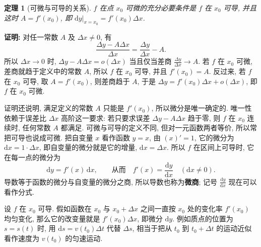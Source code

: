 \documentclass[UTF8,openany]{ctexbook}
\theoremstyle{chinesetextbook}
\newenvironment{cnproof}{\par\indent\textbf{证明:} \ignorespaces}{\par}
\newtheorem*{theoremsingle}{定理}
\newcommand{\dd}{\mathrm d}
\begin{document}
\begin{theoremsingle}[可微与可导的关系]
$f$ 在点 $x_0$ 可微的充分必要条件是 $f$ 在 $x_0$ 可导, 并且这时 $A=f'(x_0)$, 即 $\dd y\big|_{x=x_0}=f'(x_0)\Delta x$.
\end{theoremsingle}
\begin{cnproof}
对任一常数 $A$ 及 $\Delta x\ne0$, 有
\[
\frac{\Delta y-A\Delta x}{\Delta x}=\frac{\Delta y}{\Delta x}-A.
\]
所以 $\Delta x\to0$ 时, $\Delta y-A\Delta x=o(\Delta x)$ 当且仅当差商 $\displaystyle\frac{\Delta y}{\Delta x}\to A$. 若 $f$ 在 $x_0$ 可微, 差商就趋于定义中的常数 $A$, 所以 $f$ 在 $x_0$ 可导, 并且 $f'(x_0)=A$. 反过来, 若 $f$ 在 $x_0$ 可导, 取 $A=f'(x_0)$, 则差商趋于 $A$, 于是 $\Delta y=f'(x_0)\Delta x+o(\Delta x)$, 即 $f$ 在 $x_0$ 可微.
\end{cnproof}
证明还说明, 满足定义的常数 $A$ 只能是 $f'(x_0)$, 所以微分是唯一确定的. 唯一性依赖于误差比 $\Delta x$ 高阶这一要求: 若只要求误差 $\Delta y-A\Delta x$ 趋于零, 则 $f$ 在 $x_0$ 连续时, 任何常数 $A$ 都满足. 可微与可导的定义不同, 但对一元函数两者等价, 所以常把可导也说成可微. 把自变量 $x$ 看作函数 $y=x$, 由 $(x)'=1$, 它的微分为 $\dd x=1\cdot\Delta x$, 即自变量的微分就是它的增量, $\dd x=\Delta x$. 所以 $f$ 在区间上可导时, 它在每一点的微分为
\[
\dd y=f'(x)\,\dd x,\qquad\text{从而}\quad f'(x)=\frac{\dd y}{\dd x}\quad(\dd x\ne0).
\]
导数等于函数的微分与自变量的微分之商, 所以导数也称为\textbf{微商}; 记号 $\displaystyle\frac{\dd y}{\dd x}$ 现在可以看作分式.

设 $f$ 在 $x_0$ 可导. 假如函数在 $x_0$ 与 $x_0+\Delta x$ 之间一直按 $x_0$ 处的变化率 $f'(x_0)$ 均匀变化, 那么它的改变量就是 $f'(x_0)\Delta x$, 即微分 $\dd y$. 例如质点的位置为 $s=s(t)$ 时, 用 $\dd s=v(t_0)\Delta t$ 代替 $\Delta s$, 相当于把从 $t_0$ 到 $t_0+\Delta t$ 的运动近似看作速度为 $v(t_0)$ 的匀速运动.
\end{document}
